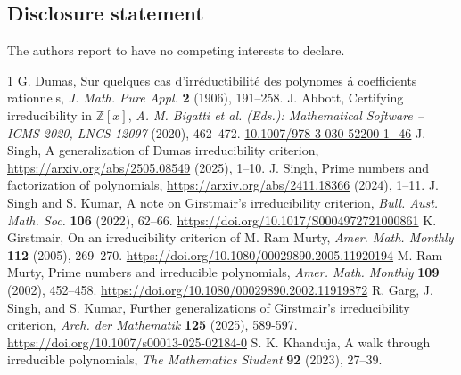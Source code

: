 \documentclass[12pt]{amsart}%
\begin{document}
\subsection*{Disclosure statement}
The authors report to have no competing interests to declare.
\begin{thebibliography}{1}
 G. Dumas, Sur quelques cas d'irr\'eductibilit\'e des polynomes \'a coefficients rationnels, \emph{J. Math. Pure Appl.} \textbf{2} (1906), 191--258.
 J. Abbott, Certifying irreducibility in $\mathbb{Z}[x]$,  \emph{A. M. Bigatti et al. (Eds.): Mathematical Software -- ICMS 2020, LNCS 12097} (2020),  462--472. \url{10.1007/978-3-030-52200-1_46}
 J. Singh, A generalization of Dumas irreducibility criterion, \url{https://arxiv.org/abs/2505.08549} (2025), 1--10.
 J. Singh, Prime numbers and factorization of polynomials, \url{https://arxiv.org/abs/2411.18366}  (2024), 1--11.
 J. Singh and  S. Kumar, {{A note on Girstmair's irreducibility criterion}}, \emph{Bull. Aust. Math. Soc.} {\textbf{106}} (2022), 62--66. \url{https://doi.org/10.1017/S0004972721000861}
 K. Girstmair, On an irreducibility criterion of M. Ram Murty,  \emph{Amer. Math. Monthly} {\bf{112}} (2005), 269--270. \url{https://doi.org/10.1080/00029890.2005.11920194}
 M. Ram Murty, Prime numbers and irreducible polynomials, \emph{Amer. Math. Monthly}  {\bf{109}} (2002), 452--458. \url{https://doi.org/10.1080/00029890.2002.11919872}
 R. Garg, J. Singh, and S. Kumar, Further generalizations of Girstmair's irreducibility criterion, \emph{Arch. der Mathematik} {\bf 125} (2025), 589-597. \url{https://doi.org/10.1007/s00013-025-02184-0}
 S. K. Khanduja, A walk through irreducible polynomials, \emph{The Mathematics Student} \textbf{92} (2023), 27--39.
\end{thebibliography}
\end{document}
